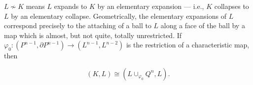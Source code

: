 $L \not\sim K$ means $L$ expands to $K$ by an elementary expansion — i.e., $K$ collapses to $L$ by an elementary collapse. Geometrically, the elementary expansions of $L$ correspond precisely to the attaching of a ball to $L$ along a face of the ball by a map which is almost, but not quite, totally unrestricted. If $\varphi_0: (P^{n-1}, \partial P^{n-1}) \to (L^{n-1}, L^{n-2})$ is the restriction of a characteristic map, then

$$(K, L) \cong (L \cup_{\varphi_0} Q^n, L).$$
